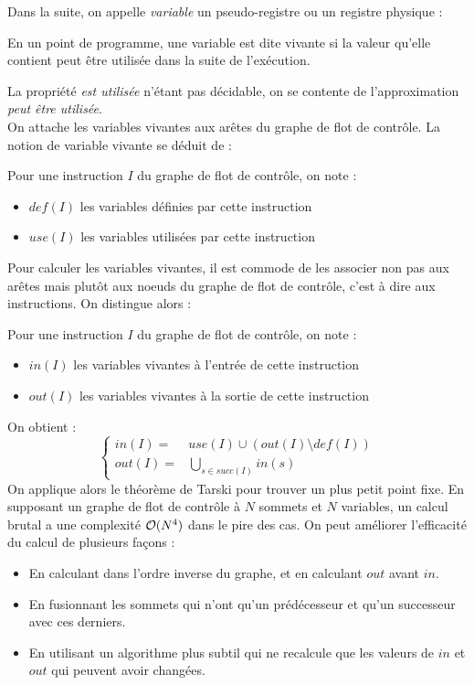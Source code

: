 \documentclass{cours}
\begin{document}
Dans la suite, on appelle \textit{variable} un pseudo-registre ou un registre physique :
\begin{definition}
    En un point de programme, une variable est dite vivante si la valeur qu'elle contient peut être utilisée dans la suite de l'exécution.
\end{definition}
La propriété \textit{est utilisée} n'étant pas décidable, on se contente de l'approximation \textit{peut être utilisée}.\\

On attache les variables vivantes aux arêtes du graphe de flot de contrôle. La notion de variable vivante se déduit de :
\begin{definition}
    Pour une instruction $I$ du graphe de flot de contrôle, on note :
    \begin{itemize}
        \item $def(I)$ les variables définies par cette instruction
        \item $use(I)$ les variables utilisées par cette instruction
    \end{itemize}
\end{definition}

Pour calculer les variables vivantes, il est commode de les associer non pas aux arêtes mais plutôt aux noeuds du graphe de flot de contrôle, c'est à dire aux instructions. On distingue alors :
\begin{definition}
    Pour une instruction $I$ du graphe de flot de contrôle, on note :
    \begin{itemize}
        \item $in(I)$ les variables vivantes à l'entrée de cette instruction
        \item $out(I)$ les variables vivantes à la sortie de cette instruction
    \end{itemize}
\end{definition}

On obtient :
\[
    \begin{cases}
        in(I) =  & use(I) \cup \left(out(I)\setminus def(I)\right) \\
        out(I) = & \bigcup_{s \in succ(I)} in(s)
    \end{cases}
\]
On applique alors le théorème de Tarski pour trouver un plus petit point fixe. En supposant un graphe de flot de contrôle à $N$ sommets et $N$ variables, un calcul brutal a une complexité $\mathcal{O}(N^{4})$ dans le pire des cas. On peut améliorer l'efficacité du calcul de plusieurs façons :
\begin{itemize}
    \item En calculant dans l'ordre inverse du graphe, et en calculant $out$ avant $in$.
    \item En fusionnant les sommets qui n'ont qu'un prédécesseur et qu'un successeur avec ces derniers.
    \item En utilisant un algorithme plus subtil qui ne recalcule que les valeurs de $in$ et $out$ qui peuvent avoir changées.
\end{itemize}
\end{document}
